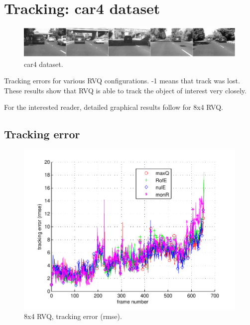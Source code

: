 \clearpage
\newpage
\section{Tracking: car4 dataset} 
								\begin{figure}[h!]
								\centering
								\includegraphics[width=1.0\textwidth]{thesis/seq_6_car4.png}
								\caption{car4 dataset.}
								\label{fig:seq_4_car4}
								\end{figure}



\begin{table}[h]
\centering

\caption{Tracking errors for various RVQ configurations.  -1 means that track was lost.  These results show that RVQ is able to track the object of interest very closely.}
\end{table}

For the interested reader, detailed graphical results follow for 8x4 RVQ.

\clearpage
\newpage
\subsection{Tracking error}

								\begin{figure}[h!]
								\centering
								\includegraphics[height=0.38\textheight]{thesis/6_car4_8_4_1000_trk_rmse.pdf}
								\caption{8x4 RVQ, tracking error (rmse).}
								\label{fig:6_car4_8_4_1000_trk_rmse}
								\end{figure}


